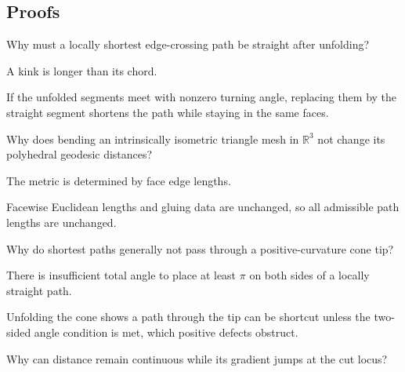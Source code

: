 \subsection*{Proofs}

\begin{exercise}\label{exr:vii38-ped-06}
Why must a locally shortest edge-crossing path be straight after unfolding?
\end{exercise}

\begin{hint}
A kink is longer than its chord.
\end{hint}

\begin{solution}
If the unfolded segments meet with nonzero turning angle, replacing them by the straight segment shortens the path while staying in the same faces.
\end{solution}

\begin{exercise}\label{exr:vii38-ped-07}
Why does bending an intrinsically isometric triangle mesh in \(\mathbb R^3\) not change its polyhedral geodesic distances?
\end{exercise}

\begin{hint}
The metric is determined by face edge lengths.
\end{hint}

\begin{solution}
Facewise Euclidean lengths and gluing data are unchanged, so all admissible path lengths are unchanged.
\end{solution}

\begin{exercise}\label{exr:vii38-ped-08}
Why do shortest paths generally not pass through a positive-curvature cone tip?
\end{exercise}

\begin{hint}
There is insufficient total angle to place at least \(\pi\) on both sides of a locally straight path.
\end{hint}

\begin{solution}
Unfolding the cone shows a path through the tip can be shortcut unless the two-sided angle condition is met, which positive defects obstruct.
\end{solution}

\begin{exercise}\label{exr:vii38-ped-09}
Why can distance remain continuous while its gradient jumps at the cut locus?
\end{exercise}

